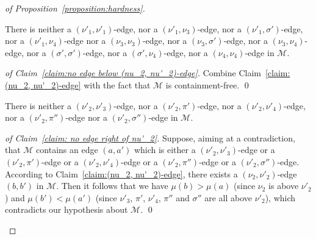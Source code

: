\begin{proof}[of Proposition~\ref{proposition:hardness}]
  \begin{claim}
    \label{claim:no edge below (nu_2, nu'_2)-edge}
    There is
    neither a $(\nu'_1, \nu'_1)$-edge,
    nor a $(\nu'_1, \nu_3)$-edge,
    nor a $(\nu'_1, \sigma')$-edge,
    nor a $(\nu'_1, \nu_4)$-edge
    nor a $(\nu_3, \nu_3)$-edge,
    nor a $(\nu_3, \sigma')$-edge,
    nor a $(\nu_3, \nu_4)$-edge,
    nor a $(\sigma', \sigma')$-edge,
    nor a $(\sigma', \nu_4)$-edge,
    nor a $(\nu_4, \nu_4)$-edge
    in $\mathcal{M}$.
  \end{claim}

  \begin{proof}[of Claim~\ref{claim:no edge below (nu_2, nu'_2)-edge}]
    Combine Claim~\ref{claim:(nu_2, nu'_2)-edge} with the fact that
    $\mathcal{M}$ is containment-free.
    \qed
  \end{proof}

  \begin{claim}
    \label{claim: no edge right of nu'_2}
    There is
    neither a $(\nu'_2, \nu'_3)$-edge,
    nor a $(\nu'_2, \pi')$-edge,
    nor a $(\nu'_2, \nu'_4)$-edge,
    nor a $(\nu'_2, \pi'')$-edge
    nor a $(\nu'_2, \sigma'')$-edge
    in $\mathcal{M}$.
  \end{claim}

  \begin{proof}[of Claim~\ref{claim: no edge right of nu'_2}]
    Suppose, aiming at a contradiction, that
    $\mathcal{M}$ contains an edge $(a, a')$ which is
    either a $(\nu'_2, \nu'_3)$-edge
    or a $(\nu'_2, \pi')$-edge
    or a $(\nu'_2, \nu'_4)$-edge
    or a $(\nu'_2, \pi'')$-edge
    or a $(\nu'_2, \sigma'')$-edge.
    According to Claim~\ref{claim:(nu_2, nu'_2)-edge},
    there exists a $(\nu_2, \nu'_2)$-edge $(b, b')$ in $\mathcal{M}$.
    Then it follows that we have
    $\mu(b) > \mu(a)$ (since $\nu_2$ is above $\nu'_2$) and
    $\mu(b') < \mu(a')$ (since $\nu'_3$, $\pi'$, $\nu'_4$, $\pi''$ and
    $\sigma''$ are all above $\nu'_2$),
    which contradicts our hypothesis about $\mathcal{M}$.
    \qed
  \end{proof}


\end{proof}
